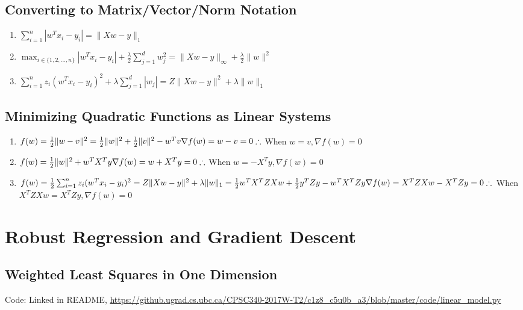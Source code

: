 \documentclass{article}
\def\norm#1{\|#1\|}
\def\enum#1{\begin{enumerate}#1\end{enumerate}}
\begin{document}
\subsection{Converting to Matrix/Vector/Norm Notation}

\enum{
\item $\sum_{i=1}^n |w^Tx_i - y_i| = \norm{Xw - y}_1$
\item $\max_{i \in \{1,2,\dots,n\}} |w^Tx_i  - y_i| + \frac{\lambda}{2}\sum_{j=1}^d w_j^2 = \norm{Xw - y}_\infty +  \frac{\lambda}{2} \norm{w}^2$
\item $\sum_{i=1}^n z_i (w^Tx_i - y_i)^2 + \lambda \sum_{j=1}^{d} |w_j| = Z \norm{Xw - y}^2 + \lambda\norm{w}_1$
}

\subsection{Minimizing Quadratic Functions as Linear Systems}

\enum {
\item $f(w) = \frac{1}{2}\norm{w-v}^2 = \frac{1}{2}\norm{w}^2 + \frac{1}{2}\norm{v}^2 - w^Tv \\
\nabla f(w) = w - v = 0 \\
\therefore$ When $w = v, \nabla f(w) = 0$
\item $f(w) = \frac{1}{2}\norm{w}^2 + w^TX^Ty \\
\nabla f(w) = w + X^Ty = 0 \\
\therefore$ When $w = -X^Ty, \nabla f(w) = 0$
\item $f(w) = \frac{1}{2}\sum_{i=1}^n z_i (w^Tx_i - y_i)^2 = Z \norm{Xw - y}^2 + \lambda\norm{w}_1 = \frac{1}{2}w^TX^TZXw + \frac{1}{2}y^TZy - w^TX^TZy \\
\nabla f(w) = X^TZXw - X^TZy = 0 \\
\therefore$ When $X^TZXw = X^TZy, \nabla f(w) = 0$
}

\section{Robust Regression and Gradient Descent}

\subsection{Weighted Least Squares in One Dimension}

Code: Linked in README, \url{https://github.ugrad.cs.ubc.ca/CPSC340-2017W-T2/c1z8_c5u0b_a3/blob/master/code/linear_model.py} \\
\end{document}
